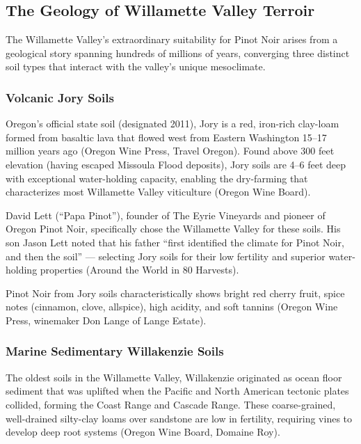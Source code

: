 \documentclass[11pt,letterpaper]{article}
\begin{document}
\subsection{The Geology of Willamette Valley Terroir}

The Willamette Valley's extraordinary suitability for Pinot Noir arises from a geological story spanning hundreds of millions of years, converging three distinct soil types that interact with the valley's unique mesoclimate.

\subsubsection{Volcanic Jory Soils}

Oregon's official state soil (designated 2011), Jory is a red, iron-rich clay-loam formed from basaltic lava that flowed west from Eastern Washington 15--17 million years ago (Oregon Wine Press, Travel Oregon). Found above 300 feet elevation (having escaped Missoula Flood deposits), Jory soils are 4--6 feet deep with exceptional water-holding capacity, enabling the dry-farming that characterizes most Willamette Valley viticulture (Oregon Wine Board).

David Lett (``Papa Pinot''), founder of The Eyrie Vineyards and pioneer of Oregon Pinot Noir, specifically chose the Willamette Valley for these soils. His son Jason Lett noted that his father ``first identified the climate for Pinot Noir, and then the soil'' --- selecting Jory soils for their low fertility and superior water-holding properties (Around the World in 80 Harvests).

Pinot Noir from Jory soils characteristically shows bright red cherry fruit, spice notes (cinnamon, clove, allspice), high acidity, and soft tannins (Oregon Wine Press, winemaker Don Lange of Lange Estate).

\subsubsection{Marine Sedimentary Willakenzie Soils}

The oldest soils in the Willamette Valley, Willakenzie originated as ocean floor sediment that was uplifted when the Pacific and North American tectonic plates collided, forming the Coast Range and Cascade Range. These coarse-grained, well-drained silty-clay loams over sandstone are low in fertility, requiring vines to develop deep root systems (Oregon Wine Board, Domaine Roy).
\end{document}
